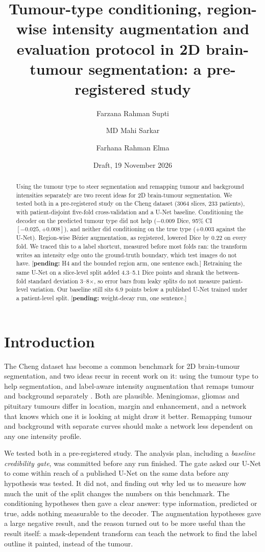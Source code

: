 \documentclass[11pt,a4paper]{article}
\title{Tumour-type conditioning, region-wise intensity augmentation and evaluation
protocol in 2D brain-tumour segmentation: a pre-registered study}
\author[1]{Farzana Rahman Supti}
\author[2,3]{MD Mahi Sarkar}
\author[4]{Farhana Rahman Elma}
\affil[1]{Department of Electrical and Computer Engineering, North South University, Dhaka, Bangladesh\\ \texttt{farzanasupti@gmail.com}}
\affil[2]{Department of Electrical and Electronic Engineering, American International University-Bangladesh (AIUB), Dhaka, Bangladesh}
\affil[3]{TechnoNext Software Ltd, Dhaka, Bangladesh}
\affil[4]{Department of Computer Science and Engineering, Independent University, Bangladesh (IUB), Dhaka, Bangladesh}
\date{Draft, 19 November 2026}
\newcommand{\pending}[1]{\textcolor{red!70!black}{[\textbf{pending:} #1]}}
\begin{document}
\maketitle

\begin{abstract}
Using the tumour type to steer segmentation and remapping tumour and background
intensities separately are two recent ideas for 2D brain-tumour segmentation. We
tested both in a pre-registered study on the Cheng dataset (3064 slices, 233
patients), with patient-disjoint five-fold cross-validation and a U-Net baseline.
Conditioning the decoder on the predicted tumour type did not help ($-0.009$ Dice,
95\% CI $[-0.025,+0.008]$), and neither did conditioning on the true type
($+0.003$ against the U-Net). Region-wise B\'ezier augmentation, as registered,
lowered Dice by 0.22 on every fold. We traced this to a label shortcut, measured
before most folds ran: the transform writes an intensity edge onto the
ground-truth boundary, which test images do not have. \pending{H4 and the bounded
region arm, one sentence each.} Retraining the same U-Net on a slice-level split
added 4.3--5.1 Dice points and shrank the between-fold standard deviation
3--8$\times$, so error bars from leaky splits do not measure patient-level
variation. Our baseline still sits 6.9 points below a published U-Net trained
under a patient-level split. \pending{weight-decay run, one sentence.}
\end{abstract}

\section{Introduction}

The Cheng dataset \citep{chengdata,cheng2015} has become a common benchmark for
2D brain-tumour segmentation, and two ideas recur in recent work on it: using the
tumour type to help segmentation, and label-aware intensity augmentation that
remaps tumour and background separately \citep{yurdakul2026}. Both are plausible.
Meningiomas, gliomas and pituitary tumours differ in location, margin and
enhancement, and a network that knows which one it is looking at might draw it
better. Remapping tumour and background with separate curves should make a
network less dependent on any one intensity profile.

We tested both in a pre-registered study. The analysis plan, including a
\emph{baseline credibility gate}, was committed before any run finished. The
gate asked our U-Net to come within reach of a published U-Net on the same data
before any hypothesis was tested. It did not, and finding out why led us to
measure how much the unit of the split changes the numbers on this benchmark.
The conditioning hypotheses then gave a clear answer: type information, predicted
or true, adds nothing measurable to the decoder. The augmentation hypotheses gave
a large negative result, and the reason turned out to be more useful than the
result itself: a mask-dependent transform can teach the network to find the label
outline it painted, instead of the tumour.
\end{document}

